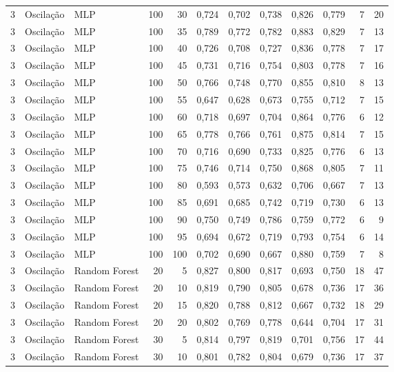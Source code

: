 \begin{longtable}{@{}rllrrrrrrrrr@{}}
3 & Oscilação & MLP & 100 & 30 & 0,724 & 0,702 & 0,738 & 0,826 & 0,779 & 7 & 20 \\
3 & Oscilação & MLP & 100 & 35 & 0,789 & 0,772 & 0,782 & 0,883 & 0,829 & 7 & 13 \\
3 & Oscilação & MLP & 100 & 40 & 0,726 & 0,708 & 0,727 & 0,836 & 0,778 & 7 & 17 \\
3 & Oscilação & MLP & 100 & 45 & 0,731 & 0,716 & 0,754 & 0,803 & 0,778 & 7 & 16 \\
3 & Oscilação & MLP & 100 & 50 & 0,766 & 0,748 & 0,770 & 0,855 & 0,810 & 8 & 13 \\
3 & Oscilação & MLP & 100 & 55 & 0,647 & 0,628 & 0,673 & 0,755 & 0,712 & 7 & 15 \\
3 & Oscilação & MLP & 100 & 60 & 0,718 & 0,697 & 0,704 & 0,864 & 0,776 & 6 & 12 \\
3 & Oscilação & MLP & 100 & 65 & 0,778 & 0,766 & 0,761 & 0,875 & 0,814 & 7 & 15 \\
3 & Oscilação & MLP & 100 & 70 & 0,716 & 0,690 & 0,733 & 0,825 & 0,776 & 6 & 13 \\
3 & Oscilação & MLP & 100 & 75 & 0,746 & 0,714 & 0,750 & 0,868 & 0,805 & 7 & 11 \\
3 & Oscilação & MLP & 100 & 80 & 0,593 & 0,573 & 0,632 & 0,706 & 0,667 & 7 & 13 \\
3 & Oscilação & MLP & 100 & 85 & 0,691 & 0,685 & 0,742 & 0,719 & 0,730 & 6 & 13 \\
3 & Oscilação & MLP & 100 & 90 & 0,750 & 0,749 & 0,786 & 0,759 & 0,772 & 6 & 9 \\
3 & Oscilação & MLP & 100 & 95 & 0,694 & 0,672 & 0,719 & 0,793 & 0,754 & 6 & 14 \\
3 & Oscilação & MLP & 100 & 100 & 0,702 & 0,690 & 0,667 & 0,880 & 0,759 & 7 & 8 \\
3 & Oscilação & Random Forest & 20 & 5 & 0,827 & 0,800 & 0,817 & 0,693 & 0,750 & 18 & 47 \\
3 & Oscilação & Random Forest & 20 & 10 & 0,819 & 0,790 & 0,805 & 0,678 & 0,736 & 17 & 36 \\
3 & Oscilação & Random Forest & 20 & 15 & 0,820 & 0,788 & 0,812 & 0,667 & 0,732 & 18 & 29 \\
3 & Oscilação & Random Forest & 20 & 20 & 0,802 & 0,769 & 0,778 & 0,644 & 0,704 & 17 & 31 \\
3 & Oscilação & Random Forest & 30 & 5 & 0,814 & 0,797 & 0,819 & 0,701 & 0,756 & 17 & 44 \\
3 & Oscilação & Random Forest & 30 & 10 & 0,801 & 0,782 & 0,804 & 0,679 & 0,736 & 17 & 37 \\

\end{longtable}
